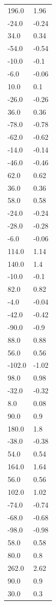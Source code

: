 \begin{longtable}{ll}
196.0 & 1.96 \\
-24.0 & -0.24 \\
34.0 & 0.34 \\
-54.0 & -0.54 \\
-10.0 & -0.1 \\
-6.0 & -0.06 \\
10.0 & 0.1 \\
-26.0 & -0.26 \\
36.0 & 0.36 \\
-78.0 & -0.78 \\
-62.0 & -0.62 \\
-14.0 & -0.14 \\
-46.0 & -0.46 \\
62.0 & 0.62 \\
36.0 & 0.36 \\
58.0 & 0.58 \\
-24.0 & -0.24 \\
-28.0 & -0.28 \\
-6.0 & -0.06 \\
114.0 & 1.14 \\
140.0 & 1.4 \\
-10.0 & -0.1 \\
82.0 & 0.82 \\
-4.0 & -0.04 \\
-42.0 & -0.42 \\
-90.0 & -0.9 \\
88.0 & 0.88 \\
56.0 & 0.56 \\
-102.0 & -1.02 \\
98.0 & 0.98 \\
-32.0 & -0.32 \\
8.0 & 0.08 \\
90.0 & 0.9 \\
180.0 & 1.8 \\
-38.0 & -0.38 \\
54.0 & 0.54 \\
164.0 & 1.64 \\
56.0 & 0.56 \\
102.0 & 1.02 \\
-74.0 & -0.74 \\
-68.0 & -0.68 \\
-98.0 & -0.98 \\
58.0 & 0.58 \\
80.0 & 0.8 \\
262.0 & 2.62 \\
90.0 & 0.9 \\
30.0 & 0.3 \\

\end{longtable}
